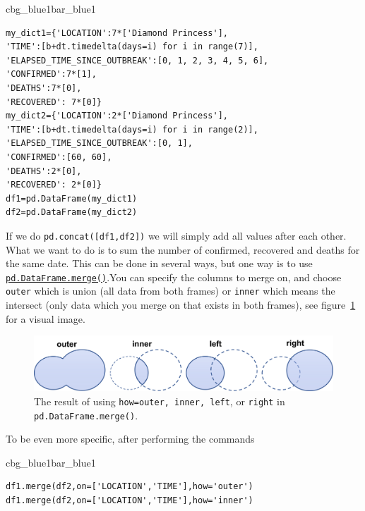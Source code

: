 \documentclass[%
oneside,                 %
final,                   %
10pt]{article}
\newenvironment{_pro_tight}[2]{
   \def\FrameCommand{\color{#2}\vrule width 1mm\normalcolor\colorbox{#1}}
   \FrameRule0.6pt\MakeFramed {\advance\hsize-2mm\FrameRestore}\vskip3mm}
   {\vskip0mm\endMakeFramed}
\newenvironment{pro}[2]{
\bgroup\rmfamily
\fboxsep=0mm\relax
\begin{_pro_tight}{#1}{#2}
\list{}{\parsep=-2mm\parskip=0mm\topsep=0pt\leftmargin=2mm
\rightmargin=2\leftmargin\leftmargin=4pt\relax}
\item\relax}
{\endlist\end{_pro_tight}\egroup}
\begin{document}
\begin{pro}{cbg_blue1}{bar_blue1}\begin{Verbatim}[numbers=none,fontsize=\fontsize{9pt}{9pt},baselinestretch=0.95,xleftmargin=2mm]
my_dict1={'LOCATION':7*['Diamond Princess'], 
'TIME':[b+dt.timedelta(days=i) for i in range(7)],
'ELAPSED_TIME_SINCE_OUTBREAK':[0, 1, 2, 3, 4, 5, 6],
'CONFIRMED':7*[1],
'DEATHS':7*[0],
'RECOVERED': 7*[0]}
my_dict2={'LOCATION':2*['Diamond Princess'], 
'TIME':[b+dt.timedelta(days=i) for i in range(2)],
'ELAPSED_TIME_SINCE_OUTBREAK':[0, 1],
'CONFIRMED':[60, 60],
'DEATHS':2*[0],
'RECOVERED': 2*[0]}
df1=pd.DataFrame(my_dict1)
df2=pd.DataFrame(my_dict2)

\end{Verbatim}
\end{pro}
\noindent

If we do \texttt{pd.concat([df1,df2])} we will simply add all values after each other. What we want to do is to sum the number of confirmed, recovered and deaths for the same date. This can be done in several ways, but one way is to use \href{{https://pandas.pydata.org/docs/reference/api/pandas.DataFrame.merge.html}}{\nolinkurl{pd.DataFrame.merge()}}.You can specify the columns to merge on, and choose \texttt{outer} which is union (all data from both frames) or \texttt{inner} which means the intersect (only data which you merge on that exists in both frames), see figure~\ref{fig:pandas:join} for a visual image.

\begin{figure}[!ht]  %
  \centerline{\includegraphics[width=1.0\linewidth]{fig-pandas/fig_join.png}}
  \caption{
  The result of using \texttt{how=outer, inner, left}, or \texttt{right} in \texttt{pd.DataFrame.merge()}. \label{fig:pandas:join}
  }
\end{figure}

To be even more specific, after performing the commands



\begin{pro}{cbg_blue1}{bar_blue1}\begin{Verbatim}[numbers=none,fontsize=\fontsize{9pt}{9pt},baselinestretch=0.95,xleftmargin=2mm]
df1.merge(df2,on=['LOCATION','TIME'],how='outer')
df1.merge(df2,on=['LOCATION','TIME'],how='inner')

\end{Verbatim}
\end{pro}
\noindent
\end{document}

